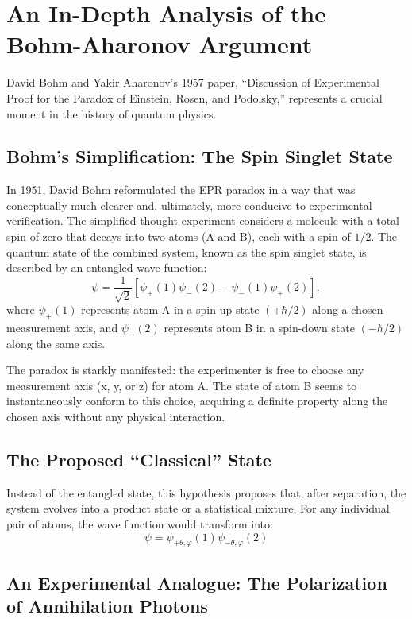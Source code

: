 \section{An In-Depth Analysis of the Bohm-Aharonov Argument}

David Bohm and Yakir Aharonov's 1957 paper, ``Discussion of Experimental Proof for the Paradox of Einstein, Rosen, and Podolsky,'' represents a crucial moment in the history of quantum physics.

\subsection{Bohm's Simplification: The Spin Singlet State}

In 1951, David Bohm reformulated the EPR paradox in a way that was conceptually much clearer and, ultimately, more conducive to experimental verification. 
The simplified thought experiment considers a molecule with a total spin of zero that decays into two atoms (A and B), each with a spin of $1/2$. The quantum 
state of the combined system, known as the spin singlet state, is described by an entangled wave function:
$$ \psi = \frac{1}{\sqrt{2}}[\psi_{+}(1)\psi_{-}(2) - \psi_{-}(1)\psi_{+}(2)], $$
where $\psi_+(1)$ represents atom A in a spin-up state $(+\hbar/2)$ along a chosen measurement axis, and $\psi_-(2)$ represents atom B in a spin-down state
$(-\hbar/2)$ along the same axis.

The paradox is starkly manifested: the experimenter is free to choose any measurement axis (x, y, or z) for atom A. The state of atom B seems to instantaneously 
conform to this choice, acquiring a definite property along the chosen axis without any physical interaction.

\subsection{The Proposed ``Classical'' State}

Instead of the entangled state, this hypothesis proposes that, after separation, the system evolves into a product state or a statistical mixture. For any individual 
pair of atoms, the wave function would transform into:
$$ \psi = \psi_{+\theta,\varphi}(1)\psi_{-\theta,\varphi}(2) $$

\subsection*{An Experimental Analogue: The Polarization of Annihilation Photons}

